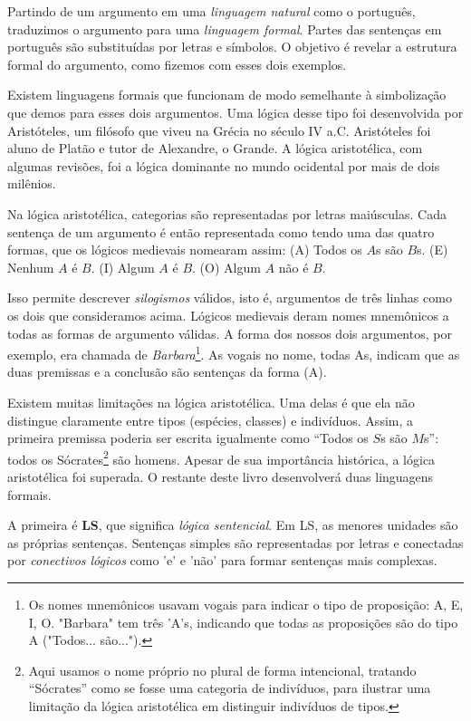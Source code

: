 Partindo de um argumento em uma \emph{linguagem natural} como o português, traduzimos o argumento para uma \emph{linguagem formal}. Partes das sentenças em português são substituídas por letras e símbolos. O objetivo é revelar a estrutura formal do argumento, como fizemos com esses dois exemplos.

Existem linguagens formais que funcionam de modo semelhante à simbolização que demos para esses dois argumentos. Uma lógica desse tipo foi desenvolvida por Aristóteles, um filósofo que viveu na Grécia no século IV a.C. Aristóteles foi aluno de Platão e tutor de Alexandre, o Grande. A lógica aristotélica, com algumas revisões, foi a lógica dominante no mundo ocidental por mais de dois milênios.

Na lógica aristotélica, categorias são representadas por letras maiúsculas. Cada sentença de um argumento é então representada como tendo uma das quatro formas, que os lógicos medievais nomearam assim: (A) Todos os $A$s são $B$s. (E) Nenhum $A$ é $B$. (I) Algum $A$ é $B$. (O) Algum $A$ não é $B$.

Isso permite descrever \emph{silogismos} válidos, isto é, argumentos de três linhas como os dois que consideramos acima. Lógicos medievais deram nomes mnemônicos a todas as formas de argumento válidas. A forma dos nossos dois argumentos, por exemplo, era chamada de \emph{Barbara}\footnote{Os nomes mnemônicos usavam vogais para indicar o tipo de proposição: A, E, I, O. "Barbara" tem três 'A's, indicando que todas as proposições são do tipo A ("Todos... são...").}. As vogais no nome, todas As, indicam que as duas premissas e a conclusão são sentenças da forma (A).

Existem muitas limitações na lógica aristotélica. Uma delas é que ela não distingue claramente entre tipos (espécies, classes) e indivíduos. Assim, a primeira premissa poderia ser escrita igualmente como ``Todos os $S$s são $M$s'': todos os Sócrates\footnote{Aqui usamos o nome próprio no plural de forma intencional, tratando “Sócrates” como se fosse uma categoria de indivíduos, para ilustrar uma limitação da lógica aristotélica em distinguir indivíduos de tipos.} são homens. Apesar de sua importância histórica, a lógica aristotélica foi superada. O restante deste livro desenvolverá duas linguagens formais.

A primeira é \textbf{LS}, que significa \emph{lógica sentencial}. Em LS, as menores unidades são as próprias sentenças. Sentenças simples são representadas por letras e conectadas por \emph{conectivos lógicos} como 'e' e 'não' para formar sentenças mais complexas.

